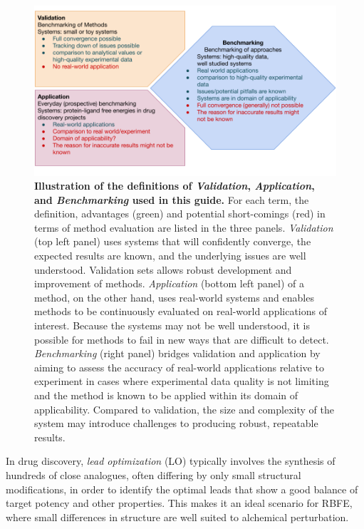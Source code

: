 \documentclass[9pt,bestpractices]{livecoms}
\begin{document}
\begin{figure}[!ht]
    \centering
    \includegraphics[width=0.95\linewidth]{figures/introduction/benchmarking_definition.png}
    \caption{
    \textbf{Illustration of the definitions of \textit{Validation}, \textit{Application}, and \textit{Benchmarking} used in this guide.} 
    For each term, the definition, advantages (green) and potential short-comings (red) in terms of method evaluation are listed in the three panels.
    \textit{Validation} (top left panel) uses systems that will confidently converge, the expected results are known, and the underlying issues are well understood. 
    Validation sets allows robust development and improvement of methods.
    \textit{Application} (bottom left panel) of a method, on the other hand, uses real-world systems and enables methods to be continuously evaluated on real-world applications of interest.
    Because the systems may not be well understood, it is possible for methods to fail in new ways that are difficult to detect.
    \textit{Benchmarking} (right panel) bridges validation and application by aiming to assess the accuracy of real-world applications relative to experiment in cases where experimental data quality is not limiting and the method is known to be applied within its domain of applicability. 
    Compared to validation, the size and complexity of the system may introduce challenges to producing robust, repeatable results.
    }%
    \label{fig:benchmarking_definition}
\end{figure}%

In drug discovery, \emph{lead optimization} (LO) typically involves the synthesis of hundreds of close analogues, often differing by only small structural modifications, in order to identify the optimal leads that show a good balance of target potency and other properties. 
This makes it an ideal scenario for RBFE, where small differences in structure are well suited to alchemical perturbation. 
\end{document}
